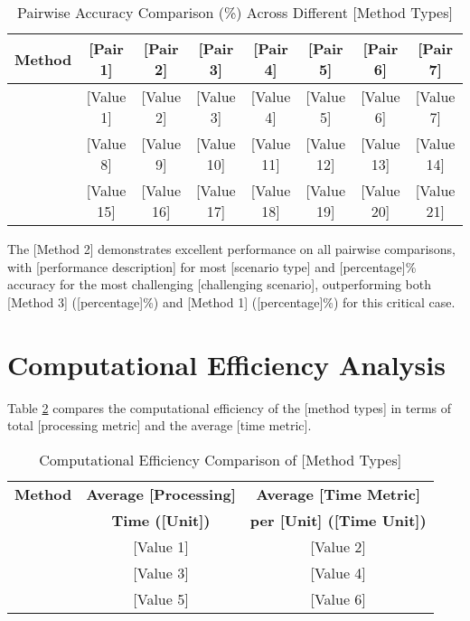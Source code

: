 \begin{table}[htbp]
\caption{Pairwise Accuracy Comparison (\%) Across Different [Method Types]}
\label{tab:pairwise_comparison}
\begin{tabular}{|l|c|c|c|c|c|c|c|}
\hline
\textbf{Method} & \textbf{[Pair 1]} & \textbf{[Pair 2]} & \textbf{[Pair 3]} & \textbf{[Pair 4]} & \textbf{[Pair 5]} & \textbf{[Pair 6]} & \textbf{[Pair 7]} \\
\hline
[Method 2] & [Value 1] & [Value 2] & [Value 3] & [Value 4] & [Value 5] & [Value 6] & [Value 7] \\
\hline
[Method 1] & [Value 8] & [Value 9] & [Value 10] & [Value 11] & [Value 12] & [Value 13] & [Value 14] \\
\hline
[Method 3] & [Value 15] & [Value 16] & [Value 17] & [Value 18] & [Value 19] & [Value 20] & [Value 21] \\
\hline
\end{tabular}
\end{table}

The [Method 2] demonstrates excellent performance on all pairwise comparisons, with [performance description] for most [scenario type] and [percentage]\% accuracy for the most challenging [challenging scenario], outperforming both [Method 3] ([percentage]\%) and [Method 1] ([percentage]\%) for this critical case.

\section{Computational Efficiency Analysis}

Table \ref{tab:processing_efficiency} compares the computational efficiency of the [method types] in terms of total [processing metric] and the average [time metric].

\begin{table}[htbp]
\caption{Computational Efficiency Comparison of [Method Types]}
\label{tab:processing_efficiency}
\begin{tabular}{|l|c|c|}
\hline
\textbf{Method} & \textbf{Average [Processing]} & \textbf{Average [Time Metric]} \\
& \textbf{Time ([Unit])} & \textbf{per [Unit] ([Time Unit])} \\
\hline
[Method 2] & [Value 1] & [Value 2] \\
[Method 1] & [Value 3] & [Value 4] \\
[Method 3] & [Value 5] & [Value 6] \\
\hline
\end{tabular}
\end{table}

